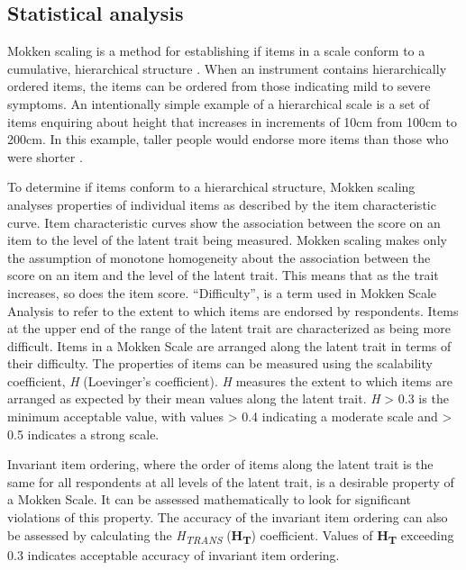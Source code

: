 \documentclass[12pt,twoside,]{pinp}
\begin{document}
\hypertarget{statistical-analysis}{%
\subsection{Statistical analysis}\label{statistical-analysis}}

Mokken scaling is a method for establishing if items in a scale conform
to a cumulative, hierarchical structure \citep{perng2012construct}. When
an instrument contains hierarchically ordered items, the items can be
ordered from those indicating mild to severe symptoms. An intentionally
simple example of a hierarchical scale is a set of items enquiring about
height that increases in increments of 10cm from 100cm to 200cm. In this
example, taller people would endorse more items than those who were
shorter \citep{watson2008hierarchy}.

To determine if items conform to a hierarchical structure, Mokken
scaling analyses properties of individual items as described by the item
characteristic curve. Item characteristic curves show the association
between the score on an item to the level of the latent trait being
measured. Mokken scaling makes only the assumption of monotone
homogeneity about the association between the score on an item and the
level of the latent trait. This means that as the trait increases, so
does the item score. ``Difficulty'', is a term used in Mokken Scale
Analysis to refer to the extent to which items are endorsed by
respondents. Items at the upper end of the range of the latent trait are
characterized as being more difficult. Items in a Mokken Scale are
arranged along the latent trait in terms of their difficulty. The
properties of items can be measured using the scalability coefficient,
\emph{H} (Loevinger's coefficient). \emph{H} measures the extent to
which items are arranged as expected by their mean values along the
latent trait. \emph{H} \textgreater{} 0.3 is the minimum acceptable
value, with values \textgreater{} 0.4 indicating a moderate scale and
\textgreater{} 0.5 indicates a strong scale.

Invariant item ordering, where the order of items along the latent trait
is the same for all respondents at all levels of the latent trait, is a
desirable property of a Mokken Scale. It can be assessed mathematically
to look for significant violations of this property. The accuracy of the
invariant item ordering can also be assessed by calculating the
\emph{H\textsubscript{TRANS}} (\textbf{H\textsubscript{T}}) coefficient.
Values of \textbf{H\textsubscript{T}} exceeding 0.3 indicates acceptable
accuracy of invariant item ordering.
\end{document}

